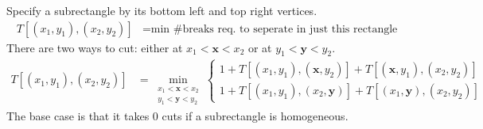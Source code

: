 Specify a subrectangle by its bottom left and top right vertices.
\begin{align}
T[(x_1, y_1), (x_2, y_2)] &= \text{min \# breaks req.~to seperate in just this rectangle}
\end{align}
There are two ways to cut: either at \(x_1 < \mathbf{x} < x_2\) or at \(y_1 < \mathbf{y} < y_2\).
\begin{align}
T[(x_1, y_1), (x_2, y_2)] &= \min_{\begin{matrix}
	x_1 < \mathbf{x} < x_2\\ y_1 < \mathbf{y} < y_2
	\end{matrix}} 
\begin{cases}
1 + T[(x_1, y_1), (\mathbf{x}, y_2)] + T[(\mathbf{x}, y_1), (x_2, y_2)] \\
1 + T[(x_1, y_1), (x_2, \mathbf{y})] + T[(x_1, \mathbf{y}), (x_2, y_2)] 
\end{cases}
\end{align}
The base case is that it takes 0 cuts if a subrectangle is homogeneous.